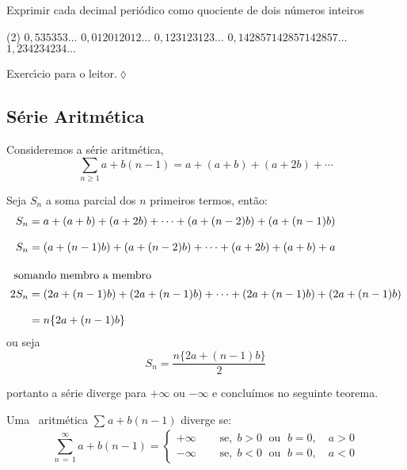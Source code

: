 \begin{exer}
Exprimir cada decimal peri\'{o}dico como quociente de dois n\'{u}meros
inteiros
\begin{tasks}[label=(\alph*),item-indent=6em,label-width=4ex,ref=(\alph*)](2)
\task  \(0,535353\ldots\)
\task \(0,012012012\ldots\)
\task \(0,123123123\ldots\)
\task  \(0,142857142857142857\ldots\)
\task  \(1,234234234\ldots\)
\end{tasks}
\end{exer}

\solo Exerc\'{\i}cio para o leitor.\hfill \(\lozenge\)

\subsection{S\'{e}rie Aritm\'{e}tica}
Consideremos a s\'{e}rie aritm\'{e}tica,
\begin{equation*}
  \sum_{n\geq 1}{a+b(n-1)}=a+(a+b)+(a+2b)+\cdots
\end{equation*}

Seja $S_n$ a soma parcial dos $n$ primeiros termos, ent\~{a}o:
\begin{align*}
  S_n &=a+(a+b)+(a+2b)+\cdots+(a+(n-2)b)+(a+(n-1)b) \\[2ex]
  S_n &=(a+(n-1)b)+(a+(n-2)b)+\cdots+(a+2b)+(a+b)+a\\[2ex]
  \intertext{ somando membro a membro}
  2S_n&=(2a+(n-1)b)+(2a+(n-1)b)+\cdots+(2a+(n-1)b)+(2a+(n-1)b)\\[2ex]
      &=n\{2a+(n-1)b\}
\end{align*}
  ou seja
\begin{equation}\label{arit1}
 S_n=\frac{n\{2a+(n-1)b\}}{2}
\end{equation}

portanto a s\'{e}rie diverge para $+\infty$ ou $-\infty$ e concluímos
no seguinte teorema.

\begin{theoc}{}{}
Uma \ser\ aritm\'{e}tica $\sum_{}{a+b(n-1)}$ diverge se:
\begin{equation*}
\sum_{n\, =\, 1}^{\infty}{a+b(n-1)}=
  \begin{cases}
    +\infty &\quad  \text{ se},\; b>0\; \text{ ou }\; b=0,\quad a>0 \\[2ex]
    -\infty &\quad \text{ se},\; b<0\; \text{ ou }\; b=0,\quad a<0
  \end{cases}
\end{equation*}
\end{theoc}

